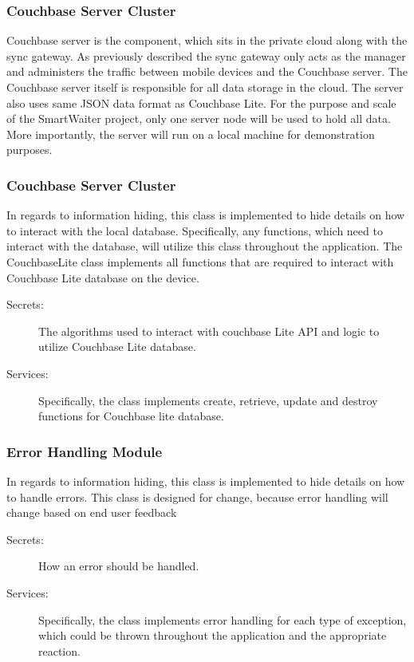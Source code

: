\documentclass[12pt, titlepage]{article}
\begin{document}
\subsubsection{Couchbase Server Cluster}
Couchbase server is the component, which sits in the private cloud along with the sync gateway. As previously described the sync gateway only acts as the manager and administers the traffic between mobile devices and the Couchbase server. The Couchbase server itself is responsible for all data storage in the cloud. The server also uses same JSON data format as Couchbase Lite. For the purpose and scale of the SmartWaiter project, only one server node will be used to hold all data. More importantly, the server will run on a local machine for demonstration purposes. 

\subsubsection{Couchbase Server Cluster}
In regards to information hiding, this class is implemented to hide details on how to interact with the local database. Specifically, any functions, which need to interact with the database, will utilize this class throughout the application. The CouchbaseLite class implements all functions that are required to interact with Couchbase Lite database on the device. 

\begin{description}
	\item[Secrets:]The algorithms used to interact with couchbase Lite API and logic to utilize Couchbase Lite database.
	\item[Services:] Specifically, the class implements create, retrieve, update and destroy functions for Couchbase lite database.
\end{description}

\subsubsection{Error Handling Module}

In regards to information hiding, this class is implemented to hide details on how to handle errors. This class is designed for change, because error handling will change based on end user feedback

\begin{description}
	\item[Secrets:]How an error should be handled.
	\item[Services:] Specifically, the class implements error handling for each type of exception, which could be thrown throughout the application and the appropriate reaction.
\end{description}
\end{document}
